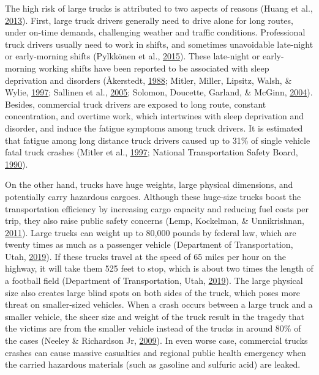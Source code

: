 \documentclass[12pt]{book}
\numberwithin{equation}{chapter}
\begin{document}
The high risk of large trucks is attributed to two aspects of reasons (Huang et al., \protect\hyperlink{ref-huang2013development}{2013}). First, large truck drivers generally need to drive alone for long routes, under on-time demands, challenging weather and traffic conditions. Professional truck drivers usually need to work in shifts, and sometimes unavoidable late-night or early-morning shifts (Pylkkönen et al., \protect\hyperlink{ref-pylkkonen2015sleepiness}{2015}). These late-night or early-morning working shifts have been reported to be associated with sleep deprivation and disorders (Åkerstedt, \protect\hyperlink{ref-aakerstedt1988sleepiness}{1988}; Mitler, Miller, Lipsitz, Walsh, \& Wylie, \protect\hyperlink{ref-mitler1997sleep}{1997}; Sallinen et al., \protect\hyperlink{ref-sallinen2005sleepiness}{2005}; Solomon, Doucette, Garland, \& McGinn, \protect\hyperlink{ref-solomon2004healthcare}{2004}). Besides, commercial truck drivers are exposed to long route, constant concentration, and overtime work, which intertwines with sleep deprivation and disorder, and induce the fatigue symptoms among truck drivers. It is estimated that fatigue among long distance truck drivers caused up to 31\% of single vehicle fatal truck crashes (Mitler et al., \protect\hyperlink{ref-mitler1997sleep}{1997}; National Transportation Safety Board, \protect\hyperlink{ref-ntsb1990}{1990}).

On the other hand, trucks have huge weights, large physical dimensions, and potentially carry hazardous cargoes. Although these huge-size trucks boost the transportation efficiency by increasing cargo capacity and reducing fuel costs per trip, they also raise public safety concerns (Lemp, Kockelman, \& Unnikrishnan, \protect\hyperlink{ref-lemp2011analysis}{2011}). Large trucks can weight up to 80,000 pounds by federal law, which are twenty times as much as a passenger vehicle (Department of Transportation, Utah, \protect\hyperlink{ref-utah2019}{2019}). If these trucks travel at the speed of 65 miles per hour on the highway, it will take them 525 feet to stop, which is about two times the length of a football field (Department of Transportation, Utah, \protect\hyperlink{ref-utah2019}{2019}). The large physical size also creates large blind spots on both sides of the truck, which poses more threat on smaller-sized vehicles. When a crash occurs between a large truck and a smaller vehicle, the sheer size and weight of the truck result in the tragedy that the victims are from the smaller vehicle instead of the trucks in around 80\% of the cases (Neeley \& Richardson Jr, \protect\hyperlink{ref-neeley2009effect}{2009}). In even worse case, commercial trucks crashes can cause massive casualties and regional public health emergency when the carried hazardous materials (such as gasoline and sulfuric acid) are leaked.
\end{document}
